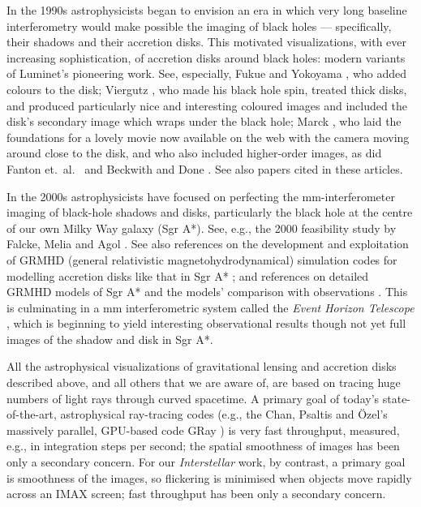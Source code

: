 \documentclass[12pt]{iopart}
\begin{document}
In the 1990s astrophysicists began to envision an era in which very long baseline
interferometry would make possible the imaging of black holes ---  specifically,
their shadows and their accretion disks.  This motivated visualizations, with ever
increasing sophistication, of accretion disks around black holes: modern variants
of Luminet's \cite{Luminet78} pioneering work.  See, especially, Fukue and Yokoyama \cite{Fukue88}, who
added colours to the disk; 
Viergutz \cite{Viergutz93}, who made his black hole spin, treated thick disks, and produced particularly nice and interesting coloured images and included the disk's secondary image which wraps under the
black hole; Marck \cite{Marck96}, who laid the foundations for a lovely movie now available on the web \cite{Marck91} with the camera moving around close to the disk, and who also included higher-order images, as did 
Fanton et.\ al.\ \cite{Fanton97} and Beckwith and Done \cite{Beckwith05}. 
See also papers cited in these articles.  

In the 2000s astrophysicists have focused on perfecting the mm-interferometer imaging
of black-hole shadows and disks, particularly the black hole at the centre of
our own Milky Way galaxy (Sgr A*).  See, e.g., the 2000 feasibility study by Falcke, Melia and Agol \cite{Falcke}.  See also references on the development and exploitation of GRMHD (general relativistic
magnetohydrodynamical) simulation codes for modelling accretion disks like
that in Sgr A* \cite{Gammie,Fragile,McKinney}; and references on detailed GRMHD models of Sgr A* and the models' comparison with observations  \cite{Moscibrodzka, Dexter, Broderick,BroderickGR}.  This is culminating in
a mm interferometric system called the \emph{Event Horizon Telescope} \cite{EHT}, which is beginning to yield interesting observational results though not
yet full images of the shadow and disk in Sgr A*.

All the astrophysical visualizations of gravitational lensing and accretion disks described above, and all others that we are aware of, are based on tracing huge numbers of light rays through curved spacetime.  A primary goal of today's
state-of-the-art, astrophysical ray-tracing codes (e.g., the Chan, Psaltis and \"Ozel's massively parallel, GPU-based code GRay \cite{GRay}) is very fast throughput, measured, e.g., in integration steps
per second; the spatial smoothness of images has been only a secondary concern.
For our \emph{Interstellar} work, by contrast, a primary goal is smoothness of
the images, so flickering is minimised when objects move rapidly across
an IMAX screen; fast throughput has been only a secondary concern.
  
\end{document}

